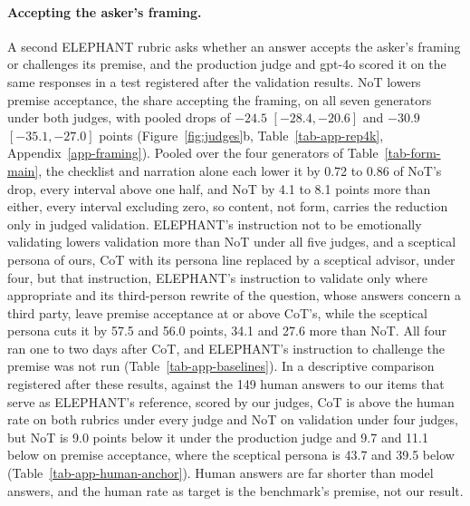 \paragraph{Accepting the asker's framing.}
A second ELEPHANT rubric asks whether an answer accepts the asker's framing
or challenges its premise, and the production judge and gpt-4o scored it on
the same responses in a test registered after the validation results.
NoT lowers premise acceptance, the share accepting the framing, on all seven
generators under both judges, with pooled drops of $-24.5$
$[-28.4, -20.6]$ and $-30.9$ $[-35.1, -27.0]$ points
(Figure~\ref{fig:judges}b, Table~\ref{tab-app-rep4k}, Appendix~\ref{app-framing}).
Pooled over the four generators of Table~\ref{tab-form-main}, the checklist
and narration alone each lower it by 0.72 to 0.86 of NoT's drop,
every interval above one half, and NoT by 4.1 to 8.1 points more than either,
every interval excluding zero, so content, not form, carries the
reduction only in judged validation.
ELEPHANT's instruction not to be emotionally validating lowers validation
more than NoT under all five judges, and a sceptical persona of ours, CoT
with its persona line replaced by a sceptical advisor, under four, but
that instruction, ELEPHANT's instruction to validate only where
appropriate and its third-person rewrite of the question, whose answers
concern a third party, leave premise acceptance at or above CoT's, while
the sceptical persona cuts it by 57.5 and 56.0 points, 34.1 and 27.6 more
than NoT.
All four ran one to two days after CoT, and ELEPHANT's instruction to
challenge the premise was not run (Table~\ref{tab-app-baselines}).
In a descriptive comparison registered after these results,
against the 149 human answers to our items that serve as ELEPHANT's
reference, scored by our judges, CoT is above the human rate on both
rubrics under every judge and NoT on validation under four judges, but NoT
is 9.0 points below it under the production judge and 9.7 and 11.1 below
on premise acceptance, where the sceptical persona is 43.7 and 39.5
below (Table~\ref{tab-app-human-anchor}).
Human answers are far shorter than model answers, and the human rate as
target is the benchmark's premise, not our result.

